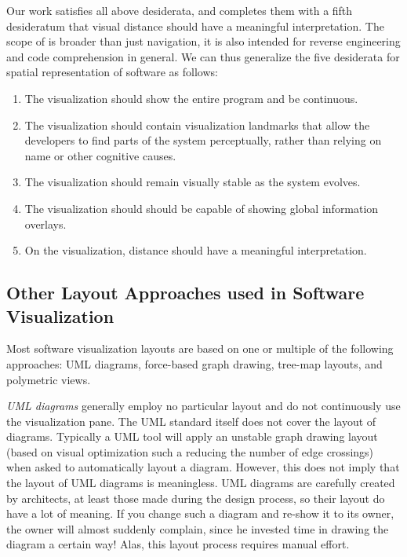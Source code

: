 Our work satisfies all above desiderata, and completes them with a fifth desideratum that visual distance should have a meaningful interpretation. The scope of \SOCA is broader than just navigation, it is also intended for reverse engineering and code comprehension in general. We can thus generalize the five desiderata for spatial representation of software as follows:

\begin{enumerate}
\item The visualization should show the entire program and be continuous.
\item The visualization should contain visualization landmarks that allow the developers to find parts of the system perceptually, rather than relying on name or other cognitive causes. 
\item The visualization should remain visually stable as the system evolves. 
\item The visualization should should be capable of showing global information overlays.
\item On the visualization, distance should have a meaningful interpretation. 
\end{enumerate}


\subsection{Other Layout Approaches used in Software Visualization}

Most software visualization layouts are based on one or multiple of the following approaches: UML diagrams, force-based graph drawing, tree-map layouts, and polymetric views.

\emph{UML diagrams} generally employ no particular layout and do not continuously use the visualization pane. The UML standard itself does not cover the layout of diagrams. Typically a UML tool will apply an unstable graph drawing layout (\eg based on visual optimization such a reducing the number of edge crossings) when asked to automatically layout a diagram. However, this does not imply that the layout of UML diagrams is meaningless. UML diagrams are carefully created by architects, at least those made during the design process, so their layout do have a lot of meaning. If you change such a diagram and re-show it to its owner, the owner will almost suddenly complain, since he invested time in drawing the diagram a certain way! Alas, this layout process requires manual effort.

